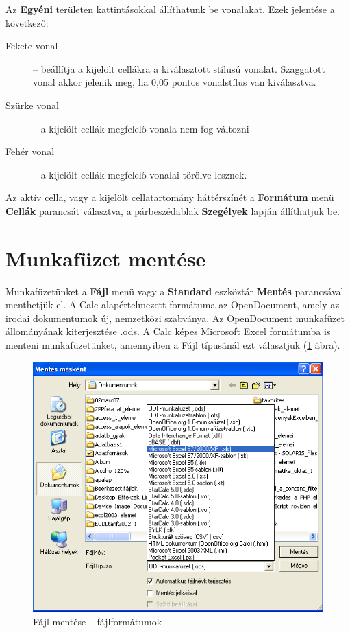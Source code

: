Az \textbf{Egyéni} területen kattintásokkal állíthatunk be
vonalakat. Ezek jelentése a következő:
\begin{description}
\item [Fekete vonal] -- beállítja a kijelölt cellákra a
kiválasztott stílusú vonalat. Szaggatott vonal akkor jelenik meg,
ha 0,05 pontos vonalstílus van kiválasztva.
\item [Szürke vonal] -- a kijelölt cellák megfelelő vonala
nem fog változni
\item [Fehér vonal] -- a kijelölt cellák megfelelő vonalai
törölve lesznek. 
\end{description}

Az aktív cella, vagy a kijelölt cellatartomány
háttérszínét a \textbf{Formátum} menü \textbf{Cellák}
parancsát választva, a párbeszédablak \textbf{Szegélyek}
lapján állíthatjuk be. 


\section{Munkafüzet mentése}

Munkafüzetünket a \textbf{Fájl} menü vagy a \textbf{Standard}
eszköztár \textbf{Mentés} parancsával menthetjük el. A Calc
alapértelmezett formátuma az OpenDocument, amely az irodai
dokumentumok új, nemzetközi szabványa. Az OpenDocument
munkafüzet állományának kiterjesztése .ods. A Calc képes
Microsoft Excel formátumba is menteni munkafüzetünket, amennyiben
a Fájl típusánál ezt választjuk (\ref{FájlFormátumok} ábra).

\begin{figure}[!h]
\begin{center}
\includegraphics[width=13.79cm]{oocalcv2-img17.png}
\caption{Fájl mentése --  fájlformátumok}\label{FájlFormátumok} 
\end{center}
\end{figure}

